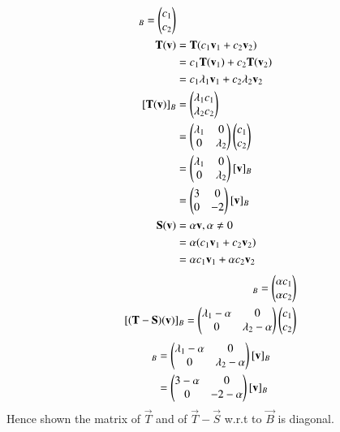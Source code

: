 \documentclass[journal,12pt]{IEEEtran}
\begin{document}
\begin{align}
    [\vec{v}]_B = \myvec{c_1 \\ c_2}\\
    \vec{T}(\vec{v}) & = \vec{T}(c_1\vec{v}_1 + c_2\vec{v}_2)\\& = c_1\vec{T}(\vec{v}_1) + c_2\vec{T}(\vec{v}_2)\\ & = c_1\lambda_1\vec{v}_1 + c_2\lambda_2\vec{v}_2\\
    [\vec{T}(\vec{v})]_B & = \myvec{\lambda_1 c_1\\ \lambda_2 c_2} \\&
    = \myvec{\lambda_1 & 0 \\ 0 & \lambda_2}\myvec{c_1 \\ c_2} \\&
    = \myvec{\lambda_1 & 0 \\ 0 & \lambda_2} [\vec{v}]_B \\& = \myvec{3 & 0\\0&-2}[\vec{v}]_B\\
    \vec{S}(\vec{v}) & = \alpha\vec{v}, \alpha \neq 0\\&
    = \alpha(c_1\vec{v}_1 + c_2\vec{v}_2)\\&
    = \alpha c_1\vec{v}_1 + \alpha c_2\vec{v}_2\\
\end{align}
\begin{align}
    [\vec{S}(\vec{v})]_B = \myvec{\alpha c_1\\ \alpha c_2}\\
    [(\vec{T}-\vec{S})(\vec{v})]_B = \myvec{\lambda_1 -\alpha & 0 \\ 0 & \lambda_2 - \alpha}\myvec{c_1 \\ c_2}
\end{align}
\begin{align}
    [(\vec{T}-\vec{S})(\vec{v})]_B & = \myvec{\lambda_1 -\alpha & 0 \\ 0 & \lambda_2 - \alpha}[\vec{v}]_B \\ & = \myvec{3 -\alpha & 0 \\ 0 & -2 - \alpha}[\vec{v}]_B
\end{align}
Hence shown the matrix of $\vec{T}$ and of $\vec{T}-\vec{S}$ w.r.t to $\vec{B}$ is diagonal.
\end{document}
